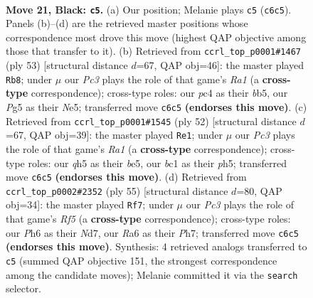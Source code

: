 \documentclass[11pt]{article}
\begin{document}
\clearpage

\begin{figure}[p]\centering
\begin{subfigure}{0.46\textwidth}\centering
\resizebox{\linewidth}{!}{%
\newchessgame
\chessboard[
  setfen={5r2/2p1qp1k/r1p4p/4p1pQ/2P1P1P1/3P4/5K2/1NB2R2 b - - 0 21},
  showmover=false,
  pgfstyle=straightmove, color=movearrow, markmove={c6-c5}
]}
\caption{}
\end{subfigure}\hfill
\begin{subfigure}{0.46\textwidth}\centering
\resizebox{\linewidth}{!}{%
\newchessgame
\chessboard[
  setfen={r5k1/p1q2p2/3p1Q2/1B1Pnp2/8/7P/P1p2PP1/2R3K1 b - - 1 27},
  showmover=false,
  pgfstyle=straightmove, color=movearrow, markmove={a8-b8}
]}
\caption{}
\end{subfigure}
\\[4pt]
\begin{subfigure}{0.46\textwidth}\centering
\resizebox{\linewidth}{!}{%
\newchessgame
\chessboard[
  setfen={4r1k1/p4p2/p5p1/4b2p/3Pq2P/2Q3P1/2P2P2/R5K1 w - - 0 27},
  showmover=false,
  pgfstyle=straightmove, color=movearrow, markmove={a1-e1}
]}
\caption{}
\end{subfigure}\hfill
\begin{subfigure}{0.46\textwidth}\centering
\resizebox{\linewidth}{!}{%
\newchessgame
\chessboard[
  setfen={r6k/2Qnq1pp/p2p4/1p1Pp3/5r2/P6B/1PP4P/1K2R1R1 b - - 3 28},
  showmover=false,
  pgfstyle=straightmove, color=movearrow, markmove={f4-f7}
]}
\caption{}
\end{subfigure}
\caption{\textbf{Move 21, Black: \texttt{c5}.} (a) Our position; Melanie plays \texttt{c5} (\texttt{c6c5}). Panels (b)--(d) are the retrieved master positions whose correspondence most drove this move (highest QAP objective among those that transfer to it). (b) Retrieved from \texttt{ccrl\_top\_p0001\#1467} (ply 53) [structural distance $d$=67, QAP obj=46]: the master played \texttt{Rb8}; under $\mu$ our \emph{Pc3} plays the role of that game's \emph{Ra1} (a \textbf{cross-type} correspondence); cross-type roles: our \emph{p}c4 as their \emph{b}b5, our \emph{P}g5 as their \emph{N}e5; transferred move \texttt{c6c5} \textbf{(endorses this move)}. (c) Retrieved from \texttt{ccrl\_top\_p0001\#1545} (ply 52) [structural distance $d$=67, QAP obj=39]: the master played \texttt{Re1}; under $\mu$ our \emph{Pc3} plays the role of that game's \emph{Ra1} (a \textbf{cross-type} correspondence); cross-type roles: our \emph{q}h5 as their \emph{b}e5, our \emph{b}c1 as their \emph{p}h5; transferred move \texttt{c6c5} \textbf{(endorses this move)}. (d) Retrieved from \texttt{ccrl\_top\_p0002\#2352} (ply 55) [structural distance $d$=80, QAP obj=34]: the master played \texttt{Rf7}; under $\mu$ our \emph{Pc3} plays the role of that game's \emph{Rf5} (a \textbf{cross-type} correspondence); cross-type roles: our \emph{P}h6 as their \emph{N}d7, our \emph{R}a6 as their \emph{P}h7; transferred move \texttt{c6c5} \textbf{(endorses this move)}. Synthesis: 4 retrieved analogs transferred to \texttt{c5} (summed QAP objective 151, the strongest correspondence among the candidate moves); Melanie committed it via the \texttt{search} selector.}
\label{fig:thought-m41}
\end{figure}
\end{document}
